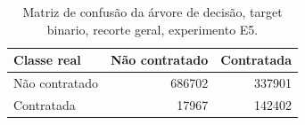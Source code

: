 \begin{table}
\caption{Matriz de confusão da árvore de decisão, target binario, recorte geral, experimento E5.}
\label{tab:matriz_confusao_treeClassification_19_profundidade_binario_recorte_geral_in_sample_e5}
\begin{tabular}{lrr}
\toprule
Classe real & Não contratado & Contratada \\
\midrule
Não contratado & 686702 & 337901 \\
Contratada & 17967 & 142402 \\
\bottomrule
\end{tabular}
\end{table}
